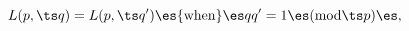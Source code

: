 \begin{equation}
L(p,\ts q) = L(p, \ts q^\prime) \es {\rm when} \es qq^\prime = 1 \es
({\rm mod} \ts p) \es, 
\label{eq:HgrdDhn}
\end{equation}

